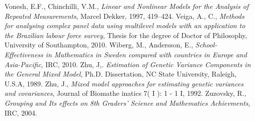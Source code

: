 \documentclass[12pt,a4paper]{article}
\begin{document}
\begin{thebibliography}{1}
 Vonesh, E.F., Chinchilli, V.M., \textit{ Linear and Nonlinear Models for the Analysis of Repeated Measurements}, Marcel Dekker, 1997, 419–424.
 Veiga, A., C., \textit{Methods for analysing complex panel data using multilevel models with an application to the Brazilian labour force survey}, Thesis for the degree of Doctor of Philosophy, University of Southampton, 2010.
 Wiberg, M., Andersson, E., \textit{School-Effectiveness in Mathematics in Sweden compared with countries in Europe and Asia-Pacific}, IRC, 2010.
 Zhu, J,. \textit{Estimation of Genetic Variance Components in the General Mixed Model},  Ph.D.
Dissertation, NC State University, Raleigh, U.S.A, 1989.   
 Zhu, J.,  \textit{Mixed model approaches for estimating genetic variances and covariances}, Journal of Biomathe inatics 7( I ): 1 - 1 I, 1992.
 Zuzovsky, R., \textit{Grouping and Its effects on 8th Graders' Science and Mathematics Achievments}, IRC, 2004.
\end{thebibliography}
\end{document}
